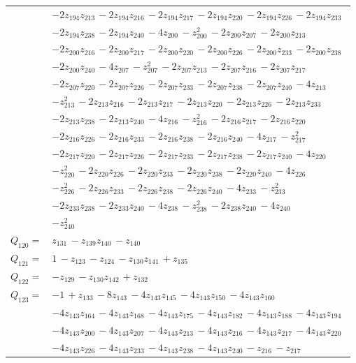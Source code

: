 \begin{longtable}{@{}r p{0.88\linewidth}@{}}
 & $-2z_{194}z_{213}\,-2z_{194}z_{216}\,-2z_{194}z_{217}\,-2z_{194}z_{220}\,-2z_{194}z_{226}\,-2z_{194}z_{233}$\\
 & $-2z_{194}z_{238}\,-2z_{194}z_{240}\,-4z_{200}\,-z_{200}^{2}\,-2z_{200}z_{207}\,-2z_{200}z_{213}$\\
 & $-2z_{200}z_{216}\,-2z_{200}z_{217}\,-2z_{200}z_{220}\,-2z_{200}z_{226}\,-2z_{200}z_{233}\,-2z_{200}z_{238}$\\
 & $-2z_{200}z_{240}\,-4z_{207}\,-z_{207}^{2}\,-2z_{207}z_{213}\,-2z_{207}z_{216}\,-2z_{207}z_{217}$\\
 & $-2z_{207}z_{220}\,-2z_{207}z_{226}\,-2z_{207}z_{233}\,-2z_{207}z_{238}\,-2z_{207}z_{240}\,-4z_{213}$\\
 & $-z_{213}^{2}\,-2z_{213}z_{216}\,-2z_{213}z_{217}\,-2z_{213}z_{220}\,-2z_{213}z_{226}\,-2z_{213}z_{233}$\\
 & $-2z_{213}z_{238}\,-2z_{213}z_{240}\,-4z_{216}\,-z_{216}^{2}\,-2z_{216}z_{217}\,-2z_{216}z_{220}$\\
 & $-2z_{216}z_{226}\,-2z_{216}z_{233}\,-2z_{216}z_{238}\,-2z_{216}z_{240}\,-4z_{217}\,-z_{217}^{2}$\\
 & $-2z_{217}z_{220}\,-2z_{217}z_{226}\,-2z_{217}z_{233}\,-2z_{217}z_{238}\,-2z_{217}z_{240}\,-4z_{220}$\\
 & $-z_{220}^{2}\,-2z_{220}z_{226}\,-2z_{220}z_{233}\,-2z_{220}z_{238}\,-2z_{220}z_{240}\,-4z_{226}$\\
 & $-z_{226}^{2}\,-2z_{226}z_{233}\,-2z_{226}z_{238}\,-2z_{226}z_{240}\,-4z_{233}\,-z_{233}^{2}$\\
 & $-2z_{233}z_{238}\,-2z_{233}z_{240}\,-4z_{238}\,-z_{238}^{2}\,-2z_{238}z_{240}\,-4z_{240}$\\
 & $-z_{240}^{2}$\\[5pt]
$Q_{120}=$ & $z_{131}\,-z_{139}z_{140}\,-z_{140}$\\[5pt]
$Q_{121}=$ & $1\,-z_{123}\,-z_{124}\,-z_{130}z_{141}\,+z_{135}$\\[5pt]
$Q_{122}=$ & $-z_{129}\,-z_{130}z_{142}\,+z_{132}$\\[5pt]
$Q_{123}=$ & $-1\,+z_{133}\,-8z_{143}\,-4z_{143}z_{145}\,-4z_{143}z_{150}\,-4z_{143}z_{160}$\\
 & $-4z_{143}z_{164}\,-4z_{143}z_{168}\,-4z_{143}z_{175}\,-4z_{143}z_{182}\,-4z_{143}z_{188}\,-4z_{143}z_{194}$\\
 & $-4z_{143}z_{200}\,-4z_{143}z_{207}\,-4z_{143}z_{213}\,-4z_{143}z_{216}\,-4z_{143}z_{217}\,-4z_{143}z_{220}$\\
 & $-4z_{143}z_{226}\,-4z_{143}z_{233}\,-4z_{143}z_{238}\,-4z_{143}z_{240}\,-z_{216}\,-z_{217}$\\

\end{longtable}
